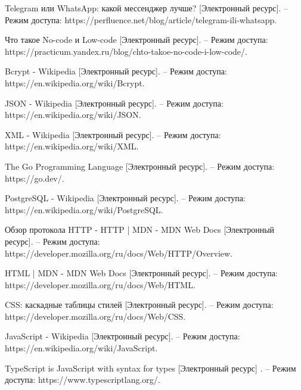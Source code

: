 \begin{references}
	\item\label{ref:best-messenger} Telegram или WhatsApp: какой мессенджер лучше? [Электронный ресурс]. – Режим доступа:
	https://perfluence.net/blog/article/telegram-ili-whatsapp.
	\item\label{ref:no-code} Что такое No-code и Low-code [Электронный ресурс]. – Режим доступа:
	https://practicum.yandex.ru/blog/chto-takoe-no-code-i-low-code/.

	\item\label{ref:bcrypt} Bcrypt - Wikipedia [Электронный ресурс]. – Режим доступа:
	https://en.wikipedia.org/wiki/Bcrypt.

	\item\label{ref:json} JSON - Wikipedia [Электронный ресурс]. – Режим доступа:
	https://en.wikipedia.org/wiki/JSON.

	\item\label{ref:xml} XML - Wikipedia [Электронный ресурс]. – Режим доступа:
	https://en.wikipedia.org/wiki/XML.

	\item\label{ref:go} The Go Programming Language [Электронный ресурс]. – Режим доступа:
	https://go.dev/.

	\item\label{ref:postgresql} PostgreSQL
	- Wikipedia [Электронный ресурс]. – Режим доступа:
	https://en.wikipedia.org/wiki/PostgreSQL.

	\item\label{ref:http} Обзор протокола HTTP
	- HTTP | MDN - MDN Web Docs [Электронный ресурс].
	– Режим доступа:
	https://developer.mozilla.org/ru/docs/Web/HTTP/Overview.

	\item\label{ref:html} HTML | MDN - MDN Web Docs [Электронный ресурс]. – Режим доступа:
	https://developer.mozilla.org/ru/docs/Web/HTML.

	\item\label{ref:css} CSS: каскадные таблицы стилей
	[Электронный ресурс]. – Режим доступа:
	https://developer.mozilla.org/ru/docs/Web/CSS.

	\item\label{ref:js} JavaScript - Wikipedia [Электронный ресурс]. – Режим доступа:
	https://en.wikipedia.org/wiki/JavaScript.

	\item\label{ref:ts} TypeScript is JavaScript
	with syntax for types [Электронный ресурс]
	. – Режим доступа:
	https://www.typescriptlang.org/.


	\label{ref:total}
\end{references}
